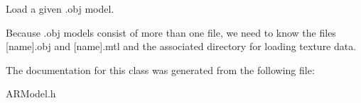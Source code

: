 Load a given .obj model. 

Because .obj models consist of more than one file, we need to know the files {\ttfamily \mbox{[}name\mbox{]}.obj} and {\ttfamily \mbox{[}name\mbox{]}.mtl} and the associated directory for loading texture data. 

The documentation for this class was generated from the following file:\begin{DoxyCompactItemize}
\item 
ARModel.h\end{DoxyCompactItemize}
